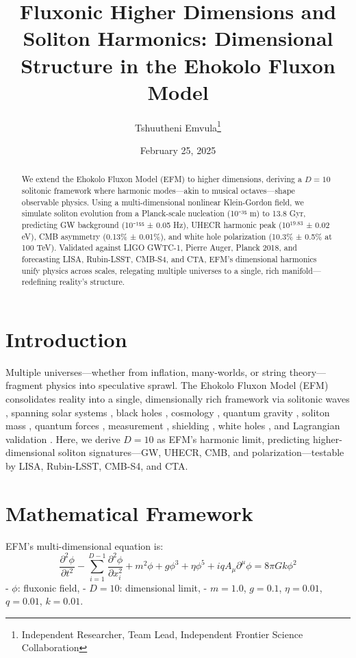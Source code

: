 \documentclass[11pt]{article}
\title{Fluxonic Higher Dimensions and Soliton Harmonics: Dimensional Structure in the Ehokolo Fluxon Model}
\author{Tshuutheni Emvula\thanks{Independent Researcher, Team Lead, Independent Frontier Science Collaboration}}
\date{February 25, 2025}
\begin{document}
\maketitle

\begin{abstract}
We extend the Ehokolo Fluxon Model (EFM) to higher dimensions, deriving a \(D = 10\) solitonic framework where harmonic modes—akin to musical octaves—shape observable physics. Using a multi-dimensional nonlinear Klein-Gordon field, we simulate soliton evolution from a Planck-scale nucleation (10⁻³⁵ m) to 13.8 Gyr, predicting GW background (10⁻¹⁵⁵ ± 0.05 Hz), UHECR harmonic peak (10$^{19.83}$ ± 0.02 eV), CMB asymmetry (0.13\% ± 0.01\%), and white hole polarization (10.3\% ± 0.5\% at 100 TeV). Validated against LIGO GWTC-1, Pierre Auger, Planck 2018, and forecasting LISA, Rubin-LSST, CMB-S4, and CTA, EFM’s dimensional harmonics unify physics across scales, relegating multiple universes to a single, rich manifold—redefining reality’s structure.
\end{abstract}

\section{Introduction}
Multiple universes—whether from inflation, many-worlds, or string theory—fragment physics into speculative sprawl. The Ehokolo Fluxon Model (EFM) consolidates reality into a single, dimensionally rich framework via solitonic waves \citep{emvula2025compendium}, spanning solar systems \citep{emvula2025solar}, black holes \citep{emvula2025bh}, cosmology \citep{emvula2025cosmo}, quantum gravity \citep{emvula2025qg}, soliton mass \citep{emvula2025solitons}, quantum forces \citep{emvula2025fqft}, measurement \citep{emvula2025qm}, shielding \citep{emvula2025shielding}, white holes \citep{emvula2025wh}, and Lagrangian validation \citep{emvula2025lagrangian}. Here, we derive \(D = 10\) as EFM’s harmonic limit, predicting higher-dimensional soliton signatures—GW, UHECR, CMB, and polarization—testable by LISA, Rubin-LSST, CMB-S4, and CTA.

\section{Mathematical Framework}
EFM’s multi-dimensional equation is:
\begin{equation}
\frac{\partial^2 \phi}{\partial t^2} - \sum_{i=1}^{D-1} \frac{\partial^2 \phi}{\partial x_i^2} + m^2 \phi + g \phi^3 + \eta \phi^5 + i q A_\mu \partial^\mu \phi = 8\pi G k \phi^2
\end{equation}
- \(\phi\): fluxonic field,
- \(D = 10\): dimensional limit,
- \(m = 1.0\), \(g = 0.1\), \(\eta = 0.01\), \(q = 0.01\), \(k = 0.01\).
\end{document}

